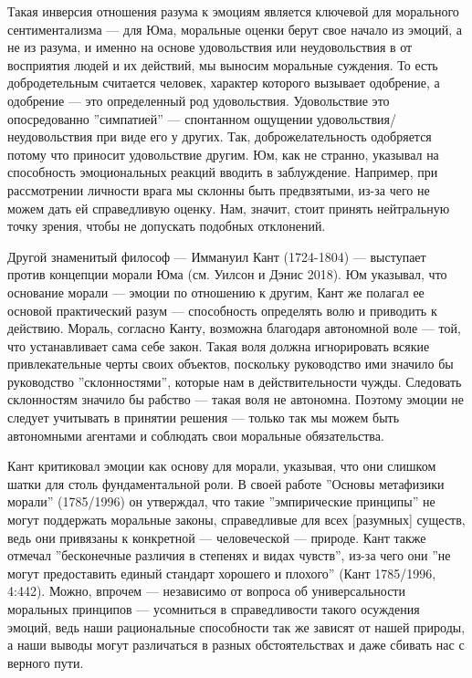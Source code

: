 \documentclass[11pt]{book}
\begin{document}
Такая инверсия отношения разума к эмоциям является ключевой для морального сентиментализма --- для Юма, моральные оценки берут свое начало из эмоций, а не из разума, и именно на основе удовольствия или неудовольствия в от восприятия людей и их действий, мы выносим моральные суждения. То есть добродетельным считается человек, характер которого вызывает одобрение, а одобрение --- это определенный род удовольствия. Удовольствие это опосредованно ''симпатией'' --- спонтанном ощущении удовольствия/неудовольствия при виде его у других. Так, доброжелательность одобряется потому что приносит удовольствие другим. Юм, как не странно, указывал на способность эмоциональных реакций вводить в заблуждение. Например, при рассмотрении личности врага мы склонны быть предвзятыми, из-за чего не можем дать ей справедливую оценку. Нам, значит, стоит принять нейтральную точку зрения, чтобы не допускать подобных отклонений.

Другой знаменитый философ --- Иммануил Кант (1724-1804) --- выступает против концепции морали Юма (см. Уилсон и Дэнис 2018). Юм указывал, что основание морали --- эмоции по отношению к другим, Кант же полагал ее основой практический разум --- способность определять волю и приводить к действию. Мораль, согласно Канту, возможна благодаря автономной воле --- той, что устанавливает сама себе закон. Такая воля должна игнорировать всякие привлекательные черты своих объектов, поскольку руководство ими значило бы руководство ''склонностями'', которые нам в действительности чужды. Следовать склонностям значило бы рабство --- такая воля не автономна. Поэтому эмоции не следует учитывать в принятии решения --- только так мы можем быть автономными агентами и соблюдать свои моральные обязательства.

Кант критиковал эмоции как основу для морали, указывая, что они слишком шатки для столь фундаментальной роли. В своей работе ''Основы метафизики морали'' (1785/1996) он утверждал, что такие ''эмпирические принципы'' не могут поддержать моральные законы, справедливые для всех [разумных] существ, ведь они привязаны к конкретной --- человеческой --- природе. Кант также отмечал ''бесконечные различия в степенях и видах чувств'', из-за чего они ''не могут предоставить единый стандарт хорошего и плохого'' (Кант 1785/1996, 4:442). Можно, впрочем --- независимо от вопроса об универсальности моральных принципов --- усомниться в справедливости такого осуждения эмоций, ведь наши рациональные способности так же зависят от нашей природы, а наши выводы могут различаться в разных обстоятельствах и даже сбивать нас с верного пути.
\end{document}
